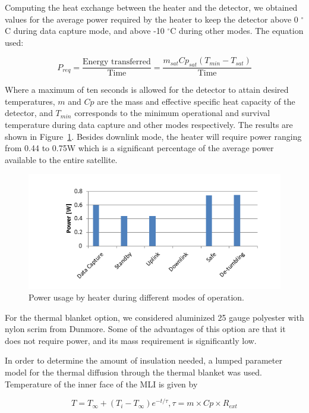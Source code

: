 \documentclass[12pt]{article}
\begin{document}
Computing the heat exchange between the heater and the detector, we obtained values for the average power required by the heater to keep the detector above 0 $^\circ$C during data capture mode, and above -10 $^\circ$C during other modes. The equation used:

\begin{equation}
P_{req} = \frac{\text{Energy transferred}}{\text{Time}} = \frac{m_{sat} Cp_{sat} (T_{min} - T_{sat})}{\text{Time}}
\label{eq:thermal-power-required}
\end{equation}

Where a maximum of ten seconds is allowed for the detector to attain desired temperatures, $m$ and $Cp$ are the mass and effective specific heat capacity of the detector, and $T_{min}$ corresponds to the minimum operational and survival temperature during data capture and other modes respectively. The results are shown in Figure~\ref{fig:thermal-power-usage}. Besides downlink mode, the heater will require power ranging from 0.44 to 0.75W which is a significant percentage of the average power available to the entire satellite.

\begin{figure}[ht]%
\centering
\includegraphics{images/thermal-power-usage}
\caption{Power usage by heater during different modes of operation.}%
\label{fig:thermal-power-usage}%
\end{figure}

For the thermal blanket option, we considered aluminized 25 gauge polyester with nylon scrim from Dunmore. Some of the advantages of this option are that it does not require power, and its mass requirement is significantly low.

In order to determine the amount of insulation needed, a lumped parameter model for the thermal diffusion through the thermal blanket was used. Temperature of the inner face of the MLI is given by

\begin{equation}
T = T_\infty + (T_i- T_\infty)e^{-t/\tau}, \tau = m \times Cp \times R_{ext}
\label{eq:thermal-inner-MLI}
\end{equation}
\end{document}
